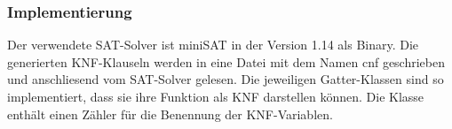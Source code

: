 \subsubsection{Implementierung}
Der verwendete SAT-Solver ist miniSAT in der Version 1.14 als Binary. Die generierten KNF-Klauseln werden in eine Datei mit dem Namen cnf geschrieben und anschliesend vom SAT-Solver gelesen. Die jeweiligen Gatter-Klassen sind so implementiert, dass sie ihre Funktion als KNF darstellen können. Die Klasse  enthält einen Zähler für die Benennung der KNF-Variablen.
